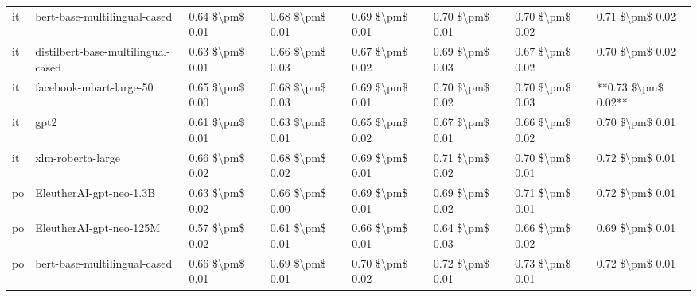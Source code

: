 \begin{tabular}{llllllll}
      it &       bert-base-multilingual-cased & 0.64 \$\textbackslash pm\$ 0.01 &           0.68 \$\textbackslash pm\$ 0.01 &       0.69 \$\textbackslash pm\$ 0.01 &        0.70 \$\textbackslash pm\$ 0.01 &                         0.70 \$\textbackslash pm\$ 0.02 &     0.71 \$\textbackslash pm\$ 0.02 \\
      it & distilbert-base-multilingual-cased & 0.63 \$\textbackslash pm\$ 0.01 &           0.66 \$\textbackslash pm\$ 0.03 &       0.67 \$\textbackslash pm\$ 0.02 &        0.69 \$\textbackslash pm\$ 0.03 &                         0.67 \$\textbackslash pm\$ 0.02 &     0.70 \$\textbackslash pm\$ 0.02 \\
      it &            facebook-mbart-large-50 & 0.65 \$\textbackslash pm\$ 0.00 &           0.68 \$\textbackslash pm\$ 0.03 &       0.69 \$\textbackslash pm\$ 0.01 &        0.70 \$\textbackslash pm\$ 0.02 &                         0.70 \$\textbackslash pm\$ 0.03 & **0.73 \$\textbackslash pm\$ 0.02** \\
      it &                               gpt2 & 0.61 \$\textbackslash pm\$ 0.01 &           0.63 \$\textbackslash pm\$ 0.01 &       0.65 \$\textbackslash pm\$ 0.02 &        0.67 \$\textbackslash pm\$ 0.01 &                         0.66 \$\textbackslash pm\$ 0.02 &     0.70 \$\textbackslash pm\$ 0.01 \\
      it &                  xlm-roberta-large & 0.66 \$\textbackslash pm\$ 0.02 &           0.68 \$\textbackslash pm\$ 0.02 &       0.69 \$\textbackslash pm\$ 0.01 &        0.71 \$\textbackslash pm\$ 0.02 &                         0.70 \$\textbackslash pm\$ 0.01 &     0.72 \$\textbackslash pm\$ 0.01 \\
      po &            EleutherAI-gpt-neo-1.3B & 0.63 \$\textbackslash pm\$ 0.02 &           0.66 \$\textbackslash pm\$ 0.00 &       0.69 \$\textbackslash pm\$ 0.01 &        0.69 \$\textbackslash pm\$ 0.02 &                         0.71 \$\textbackslash pm\$ 0.01 &     0.72 \$\textbackslash pm\$ 0.01 \\
      po &            EleutherAI-gpt-neo-125M & 0.57 \$\textbackslash pm\$ 0.02 &           0.61 \$\textbackslash pm\$ 0.01 &       0.66 \$\textbackslash pm\$ 0.01 &        0.64 \$\textbackslash pm\$ 0.03 &                         0.66 \$\textbackslash pm\$ 0.02 &     0.69 \$\textbackslash pm\$ 0.01 \\
      po &       bert-base-multilingual-cased & 0.66 \$\textbackslash pm\$ 0.01 &           0.69 \$\textbackslash pm\$ 0.01 &       0.70 \$\textbackslash pm\$ 0.02 &        0.72 \$\textbackslash pm\$ 0.01 &                         0.73 \$\textbackslash pm\$ 0.01 &     0.72 \$\textbackslash pm\$ 0.01 \\

\end{tabular}
